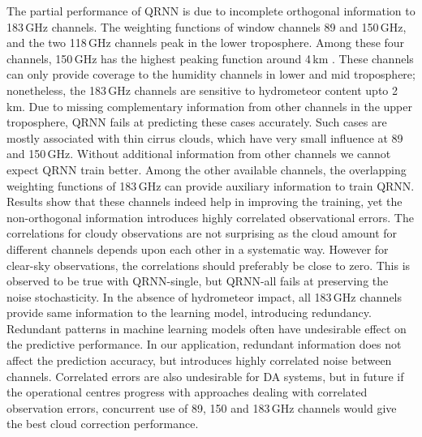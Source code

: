 \documentclass[amt, manuscript]{copernicus}
\begin{document}
The partial performance of QRNN is due to incomplete orthogonal information to 183\,GHz channels. The weighting functions of window channels 89 and 150\,GHz, and the two 118\,GHz channels peak in the lower troposphere. Among these four channels, 150\,GHz has the highest peaking function around 4\,km \citep{chen2020mwhs}. These channels can only provide coverage to the humidity channels in lower and mid troposphere; nonetheless, the 183\,GHz channels are sensitive to hydrometeor content upto 2\,km. Due to missing complementary information from other channels in the upper troposphere, QRNN fails at predicting these cases accurately. Such cases are mostly associated with thin cirrus clouds, which have very small influence at 89 and 150\,GHz. Without additional information from other channels we cannot expect QRNN train better. Among the other available channels, the overlapping weighting functions of 183\,GHz can provide auxiliary information to train QRNN. Results show that these channels indeed help in improving the training, yet the non-orthogonal information introduces highly correlated observational errors. The correlations for cloudy observations are not surprising as the cloud amount for different channels depends upon each other in a systematic way. However for clear-sky observations, the correlations should preferably be close to zero. This is observed to be true with QRNN-single, but QRNN-all fails at preserving the noise stochasticity. In the absence of hydrometeor impact, all 183\,GHz channels provide same information to the learning model, introducing redundancy. Redundant patterns in machine learning models often have undesirable effect on the predictive performance. In our application, redundant information does not affect the prediction accuracy, but introduces highly correlated noise between channels. Correlated errors are also undesirable for DA systems, but in future if the operational centres progress with approaches dealing with correlated observation errors, concurrent use of 89, 150 and 183\,GHz channels would give the best cloud correction performance.
\end{document}
